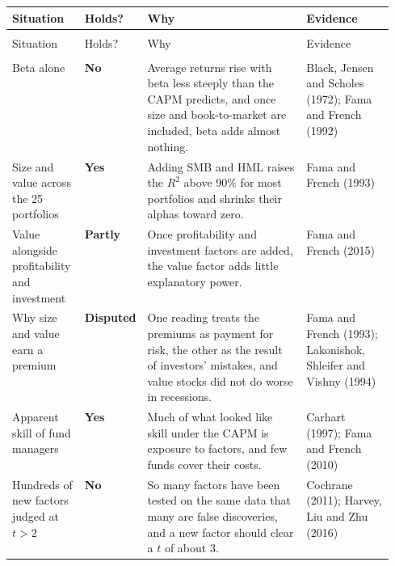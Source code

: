 \begingroup
\small
\setlength{\LTpre}{6pt}\setlength{\LTpost}{6pt}
\begin{longtable}{@{}>{\raggedright\arraybackslash}p{0.19\linewidth}>{\raggedright\arraybackslash}p{0.13\linewidth}>{\raggedright\arraybackslash}p{}>{\raggedright\arraybackslash}p{0.23\linewidth}@{}}
\toprule
Situation & Holds? & Why & Evidence \\
\midrule
\endfirsthead
\multicolumn{4}{@{}l}{\emph{(continued)}} \\
\toprule
Situation & Holds? & Why & Evidence \\
\midrule
\endhead
\midrule
\multicolumn{4}{r@{}}{\emph{(continued on the next page)}} \\
\endfoot
\bottomrule
\endlastfoot
Beta alone & \textbf{No} & Average returns rise with beta less steeply than the CAPM predicts, and once size and book-to-market are included, beta adds almost nothing. & Black, Jensen and Scholes (1972); Fama and French (1992) \\*
\addlinespace[3pt]
Size and value across the 25 portfolios & \textbf{Yes} & Adding SMB and HML raises the $R^2$ above 90\% for most portfolios and shrinks their alphas toward zero. & Fama and French (1993) \\
\addlinespace[3pt]
Value alongside profitability and investment & \textbf{Partly} & Once profitability and investment factors are added, the value factor adds little explanatory power. & Fama and French (2015) \\
\addlinespace[3pt]
Why size and value earn a premium & \textbf{Disputed} & One reading treats the premiums as payment for risk, the other as the result of investors' mistakes, and value stocks did not do worse in recessions. & Fama and French (1993); Lakonishok, Shleifer and Vishny (1994) \\
\addlinespace[3pt]
Apparent skill of fund managers & \textbf{Yes} & Much of what looked like skill under the CAPM is exposure to factors, and few funds cover their costs. & Carhart (1997); Fama and French (2010) \\*
\addlinespace[3pt]
Hundreds of new factors judged at $t > 2$ & \textbf{No} & So many factors have been tested on the same data that many are false discoveries, and a new factor should clear a $t$ of about 3. & Cochrane (2011); Harvey, Liu and Zhu (2016) \\
\end{longtable}
\addtocounter{table}{-1}%
\endgroup

